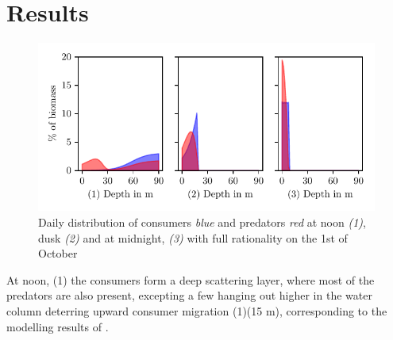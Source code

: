 \section{Results}
\begin{figure}[H]
\includegraphics{plots/specific_dists_rational.pdf}
\caption{Daily distribution of consumers \emph{blue} and predators \emph{red} at noon \emph{(1)}, dusk \emph{(2)} and at midnight, \emph{(3)} with full rationality on the 1st of October}
\label{fig:specific_dists_rational}
\end{figure}
At noon, (1) the consumers form a deep scattering layer, where most of the predators are also present, excepting a few hanging out higher in the water column deterring upward consumer migration (1)(15 m), corresponding to the modelling results of \citep{jerome}.

